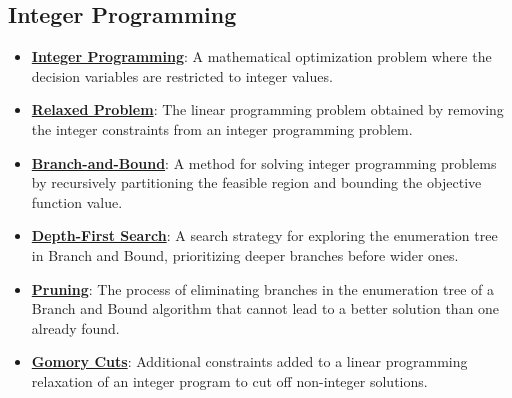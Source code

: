 \documentclass{article}%
\begin{document}
\subsection{Integer Programming}%
\label{subsec:IntegerProgramming}%
\begin{itemize}[leftmargin=*]%
\item \href{https://www.math.purdue.edu/~yipn/421/2024-10-31-IntLinProg.pdf#page=1}{\textbf{Integer Programming}}: A mathematical optimization problem where the decision variables are restricted to integer values.%
\item \href{https://www.math.purdue.edu/~yipn/421/2024-10-31-IntLinProg.pdf#page=2}{\textbf{Relaxed Problem}}: The linear programming problem obtained by removing the integer constraints from an integer programming problem.%
\item \href{https://www.math.purdue.edu/~yipn/421/2024-10-31-IntLinProg.pdf#page=5}{\textbf{Branch-and-Bound}}: A method for solving integer programming problems by recursively partitioning the feasible region and bounding the objective function value.%
\item \href{https://www.math.purdue.edu/~yipn/421/2024-10-31-IntLinProg.pdf#page=11}{\textbf{Depth-First Search}}: A search strategy for exploring the enumeration tree in Branch and Bound, prioritizing deeper branches before wider ones.%
\item \href{https://www.math.purdue.edu/~yipn/421/2024-10-31-IntLinProg.pdf#page=11}{\textbf{Pruning}}: The process of eliminating branches in the enumeration tree of a Branch and Bound algorithm that cannot lead to a better solution than one already found.%
\item \href{https://www.math.purdue.edu/~yipn/421/2024-10-31-IntLinProg.pdf#page=15}{\textbf{Gomory Cuts}}: Additional constraints added to a linear programming relaxation of an integer program to cut off non-integer solutions.%
\end{itemize}

%
\end{document}
